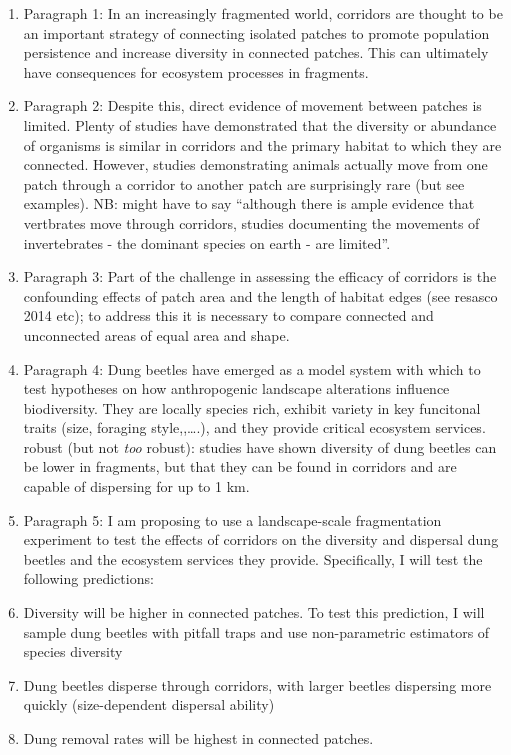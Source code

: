 \documentclass[
  12pt,
]{article}
\begin{document}
\begin{enumerate}
\def\labelenumi{\arabic{enumi}.}
\item
  Paragraph 1: In an increasingly fragmented world, corridors are
  thought to be an important strategy of connecting isolated patches to
  promote population persistence and increase diversity in connected
  patches. This can ultimately have consequences for ecosystem processes
  in fragments.
\item
  Paragraph 2: Despite this, direct evidence of movement between patches
  is limited. Plenty of studies have demonstrated that the diversity or
  abundance of organisms is similar in corridors and the primary habitat
  to which they are connected. However, studies demonstrating animals
  actually move from one patch through a corridor to another patch are
  surprisingly rare (but see examples). NB: might have to say ``although
  there is ample evidence that vertbrates move through corridors,
  studies documenting the movements of invertebrates - the dominant
  species on earth - are limited''.
\item
  Paragraph 3: Part of the challenge in assessing the efficacy of
  corridors is the confounding effects of patch area and the length of
  habitat edges (see resasco 2014 etc); to address this it is necessary
  to compare connected and unconnected areas of equal area and shape.
\item
  Paragraph 4: Dung beetles have emerged as a model system with which to
  test hypotheses on how anthropogenic landscape alterations influence
  biodiversity. They are locally species rich, exhibit variety in key
  funcitonal traits (size, foraging style,,\ldots.), and they provide
  critical ecosystem services. robust (but not \emph{too} robust):
  studies have shown diversity of dung beetles can be lower in
  fragments, but that they can be found in corridors and are capable of
  dispersing for up to 1 km.
\item
  Paragraph 5: I am proposing to use a landscape-scale fragmentation
  experiment to test the effects of corridors on the diversity and
  dispersal dung beetles and the ecosystem services they provide.
  Specifically, I will test the following predictions:
\item
  Diversity will be higher in connected patches. To test this
  prediction, I will sample dung beetles with pitfall traps and use
  non-parametric estimators of species diversity
\item
  Dung beetles disperse through corridors, with larger beetles
  dispersing more quickly (size-dependent dispersal ability)
\item
  Dung removal rates will be highest in connected patches.
\end{enumerate}
\end{document}
